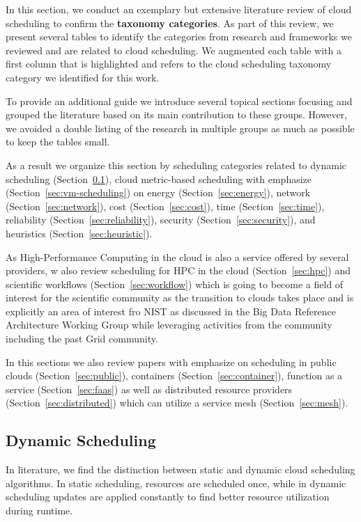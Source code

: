 \documentclass[final,5p,times,twocolumn]{elsarticle}
\begin{document}
In this section, we conduct an exemplary but extensive literature
review of cloud scheduling to confirm the {\bf taxonomy
 categories}. As part of this review, we present several tables to identify the categories from research and frameworks we reviewed and are related to cloud scheduling. We augmented each table with a first column that is highlighted and refers to the cloud scheduling taxonomy category we identified for this work.

To provide an additional guide we introduce several topical sections focusing and grouped the literature based on its main contribution to these groups. However, we avoided a double listing of the research in multiple groups as much as possible to keep the tables small.

As a result we organize this section by scheduling categories related to 
%
dynamic scheduling (Section~\ref{sec:dynamic}),
cloud metric-based scheduling with emphasize (Section~\ref{sec:vm-scheduling}) on 
energy (Section~\ref{sec:energy}),
network (Section~\ref{sec:network}),
cost (Section~\ref{sec:cost}),
time (Section~\ref{sec:time}),
reliability (Section~\ref{sec:reliability}),
security (Section~\ref{sec:security}), 
and heuristics (Section~\ref{sec:heuristic}).

As High-Performance Computing in the cloud is also a service offered by several providers, w also review scheduling for HPC in the cloud (Section~\ref{sec:hpc}) and scientific workflows (Section~\ref{sec:workflow}) which is going to become a field of interest for the scientific community as the transition to clouds takes place and is explicitly an area of interest fro NIST as discussed in the Big Data Reference Architecture Working Group while leveraging activities from the community including the past Grid community.

In this sections we also review papers with emphasize on scheduling in public clouds (Section~\ref{sec:public}), containers (Section~\ref{sec:container}), function as a service (Section~\ref{sec:faas}) as well as distributed resource providers (Section~\ref{sec:distributed}) which can utilize a service mesh (Section~\ref{sec:mesh}).





\subsection{Dynamic Scheduling}\label{sec:dynamic}

In literature, we find the distinction between static and dynamic cloud scheduling algorithms. In static scheduling, resources are scheduled once, while in dynamic scheduling updates are applied constantly to find better resource utilization during runtime.
\end{document}
